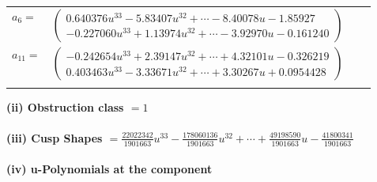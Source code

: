 \documentclass[1p]{elsarticle_modified}
\theoremstyle{definition}
\begin{document}
\begin{tabular}{m{7pt} m{180pt} m{7pt} m{180pt} }
\flushright $a_{6}=$&$\begin{pmatrix}0.640376 u^{33}-5.83407 u^{32}+\cdots-8.40078 u-1.85927\\-0.227060 u^{33}+1.13974 u^{32}+\cdots-3.92970 u-0.161240\end{pmatrix}$ \\
\flushright $a_{11}=$&$\begin{pmatrix}-0.242654 u^{33}+2.39147 u^{32}+\cdots+4.32101 u-0.326219\\0.403463 u^{33}-3.33671 u^{32}+\cdots+3.30267 u+0.0954428\end{pmatrix}$\\&\end{tabular}
\flushleft \textbf{(ii) Obstruction class $= 1$}\\~\\
\flushleft \textbf{(iii) Cusp Shapes $= \frac{22022342}{1901663} u^{33}-\frac{178060136}{1901663} u^{32}+\cdots+\frac{49198590}{1901663} u-\frac{41800341}{1901663}$}\\~\\
\newpage\renewcommand{\arraystretch}{1}
\flushleft \textbf{(iv) u-Polynomials at the component}\newline \\
\end{document}
